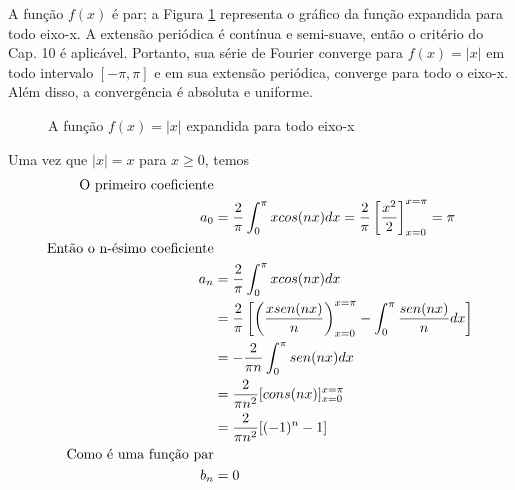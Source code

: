 A função $f(x)$ é par; a Figura \ref{fig:exemplo2} representa o gráfico da função 
expandida para todo eixo-x. A extensão periódica é contínua e semi-suave, então o critério
do Cap. 10 é aplicável. Portanto, sua série de Fourier converge para $f(x) = |x|$ em 
todo intervalo $[-\pi,\pi]$ e em sua extensão periódica, converge para todo o eixo-x.
Além disso, a convergência é absoluta e uniforme.

\begin{figure}[H]

    \caption{A função $f(x) = |x|$ expandida para todo eixo-x}
    \label{fig:exemplo2}
\end{figure}

Uma vez que $|x| = x$ para $x \geq 0$, temos
\begin{equation}
\notag
    \begin{split}
        \text{O primeiro coeficiente}&\\
        a_0 &= \dfrac{2}{\pi}\int_0^{\pi}x cos(nx)dx = \dfrac{2}{\pi} \left[\dfrac{x^2}{2}\right]_{x=0}^{x=\pi} = \pi\\
        \text{Então o n-ésimo coeficiente}&\\
        a_n &= \dfrac{2}{\pi}\int_{0}^{\pi}x cos(nx)dx\\
        &= \dfrac{2}{\pi}\left[\left(\dfrac{x sen(nx)}{n}\right)_{x=0}^{x=\pi} - \int_{0}^{\pi}\dfrac{sen(nx)}{n}dx\right]\\
        &= -\dfrac{2}{\pi n}\int_{0}^{\pi}sen(nx)dx\\
        &= \dfrac{2}{\pi n^2}[cons(nx)]_{x=0}^{x=\pi}\\
        &= \dfrac{2}{\pi n^2}[(-1)^n - 1]\\
        \text{Como é uma função par}&\\
        b_n &= 0
    \end{split}
\end{equation}

